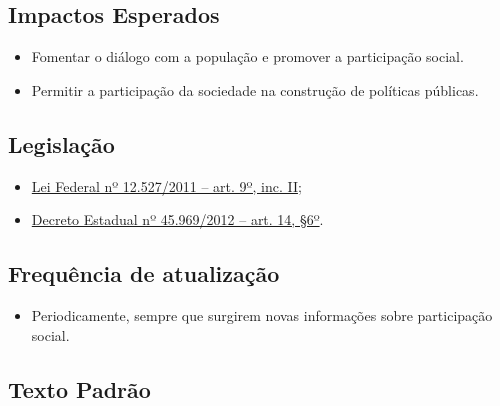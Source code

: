 \documentclass[
]{book}
\providecommand{\tightlist}{%
  \setlength{\itemsep}{0pt}\setlength{\parskip}{0pt}}
\begin{document}
\hypertarget{impactos-esperados-15}{%
\subsection{Impactos Esperados}\label{impactos-esperados-15}}

\begin{itemize}
\tightlist
\item
  Fomentar o diálogo com a população e promover a participação social.
\item
  Permitir a participação da sociedade na construção de políticas públicas.
\end{itemize}

\hypertarget{legislauxe7uxe3o-15}{%
\subsection{Legislação}\label{legislauxe7uxe3o-15}}

\begin{itemize}
\tightlist
\item
  \href{http://www.planalto.gov.br/ccivil_03/_ato2011-2014/2011/lei/l12527.htm\#art9}{Lei Federal nº 12.527/2011 -- art. 9º, inc. II};
\item
  \href{https://www.almg.gov.br/consulte/legislacao/completa/completa.html?tipo=DEC\&num=45969\&ano=2012}{Decreto Estadual nº 45.969/2012 -- art. 14, §6º}.
\end{itemize}

\hypertarget{frequuxeancia-de-atualizauxe7uxe3o-14}{%
\subsection{Frequência de atualização}\label{frequuxeancia-de-atualizauxe7uxe3o-14}}

\begin{itemize}
\tightlist
\item
  Periodicamente, sempre que surgirem novas informações sobre participação social.
\end{itemize}

\hypertarget{texto-padruxe3o-14}{%
\subsection{Texto Padrão}\label{texto-padruxe3o-14}}
\end{document}
